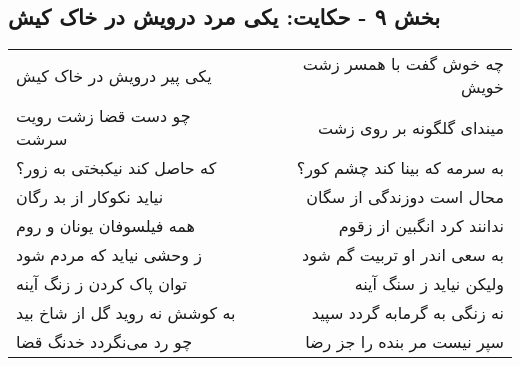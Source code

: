 \begin{center}
\section*{بخش ۹ - حکایت: یکی مرد درویش در خاک کیش}
\label{sec:009}
\begin{longtable}{l p{0.5cm} r}
یکی پیر درویش در خاک کیش
&&
چه خوش گفت با همسر زشت خویش
\\
چو دست قضا زشت رویت سرشت
&&
میندای گلگونه بر روی زشت
\\
که حاصل کند نیکبختی به زور؟
&&
به سرمه که بینا کند چشم کور؟
\\
نیاید نکوکار از بد رگان
&&
محال است دوزندگی از سگان
\\
همه فیلسوفان یونان و روم
&&
ندانند کرد انگبین از زقوم
\\
ز وحشی نیاید که مردم شود
&&
به سعی اندر او تربیت گم شود
\\
توان پاک کردن ز زنگ آینه
&&
ولیکن نیاید ز سنگ آینه
\\
به کوشش نه روید گل از شاخ بید
&&
نه زنگی به گرمابه گردد سپید
\\
چو رد می‌نگردد خدنگ قضا
&&
سپر نیست مر بنده را جز رضا
\\
\end{longtable}
\end{center}
